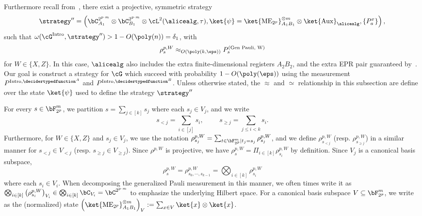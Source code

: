 Furthermore recall from~, there exist a projective, symmetric strategy 
\begin{equation} \label{eq:QRsoundnessstrategy}
	\strategy'' =  \left(\bC^{2^{p\cdot m}}_{A_1} \otimes \bC^{2^{p \cdot m}}_{B_1} \otimes  \cL^2(\alicealg,\tau), \ket{\psi} = \ket{\text{ME}_{2^p}}^{\otimes m}_{A_1 B_1} \otimes \ket{\text{Aux}}_{\alicealg}, \{ P_{a}^x \} \right),
\end{equation}
such that $\omega(\cG^{\text{Intro}}, \strategy'') > 1 - O(\poly(n)) = \delta_1$, with 
\begin{equation} \label{eq:QRsoundnessapproxgenpauli}
	\rho^{p, W}_{s}  \approx_{O(\poly(k, \eps))} P^{(\text{Gen Pauli, W})}_s
\end{equation}
for $W \in \{X,Z\}$. In this case, $\alicealg$ also includes the extra finite-dimensional registers $A_2 B_2$, and the extra EPR pair guaranteed by~. Our goal is construct a strategy for $\cG$ which succeed with probability $1 - O(\poly(\eps))$ using the measurement $P^{\text{Intro}, \decidertypedfunction^{A}}$ and $P^{\text{Intro}, \decidertypedfunction^{B}}$. Unless otherwise stated, the $\approx$ and $\simeq$ relationship in this subsection are define over the state $\ket{\psi}$ used to define the strategy $\strategy''$ 

For every $s \in \bF_{2^p}^m$, we partition $s = \sum_{j \in [k]} s_j$ where each $s_j \in V_j$, and we write 
\begin{equation}
	s_{<j} = \sum_{i \in [j]} s_i, \, \qquad \, s_{\geq j} = \sum_{j \leq i <k} s_i.
\end{equation}
Furthermore, for $W \in \{X,Z\}$ and $s_j \in V_j$, we use the notation $\rho^{p, W}_{s_j} =  \sum_{t \in \bF_{2^p}^m| t_j = s_j}\rho^{p, W}_{s_j}$, and we define $\rho^{p, W}_{s_{< j}}$ (resp. $\rho^{p, W}_{s_{\geq j}}$) in a similar manner for $s_{< j} \in V_{< j}$ (resp. $s_{\geq j} \in  V_{\geq j}$). Since $\rho^{p, W}$ is projective, we have $\rho^{p, W}_s = \Pi_{i \in [k]} \rho^{p, W}_{s_i}$ by definition. Since $V_j$ is a canonical basis subspace, 
\begin{equation}
	\rho^{p, W}_s = \rho^{p, W}_{s_0, \cdots, s_{k-1}}  = \bigotimes_{i \in [k]} \rho^{p, W}_{s_i}
\end{equation}
where each $s_i \in V_i$. When decomposing the generalized Pauli measurement in this manner, we often times write it as $\bigotimes_{i \in [k]} \left(\rho^{p, W}_{s_i}\right)_{V_i} \in \bigotimes_{i \in [k]} \bC_{V_i} = \bC^{2^{p\cdot m}}$ to emphasize the underlying Hilbert space. For a canonical basis subspace $V \subseteq \bF_{2^p}^m$, we write as the (normalized) state $\left(\ket{\text{ME}_{2^p}}^{\otimes m}_{A_1 B_1} \right)_V := \sum_{x \in V} \ket{x} \otimes \ket{x}$.

